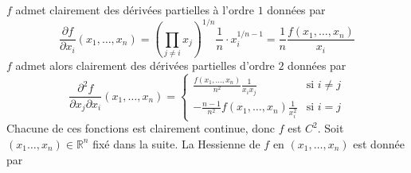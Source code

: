 \documentclass{report}
\begin{document}
\subsection{} \noindent{}\\ 
\\ 
\\
\noindent $f$ admet clairement des dérivées partielles à l'ordre $1$ données par $$\frac{\partial f}{\partial x_i}(x_1,\ldots,x_n)=\left( \prod_{j\neq i} x_j\right)^{1/n}\frac{1}{n}\cdot x_i^{ 1/n -1}=\frac{1}{n}\frac{f(x_1,\ldots,x_n)}{x_i}$$
$f$ admet alors clairement des dérivées partielles d'ordre $2$ données par 
$$\frac{\partial^2 f}{\partial x_j \partial x_i}(x_1,\ldots, x_n) = \begin{cases}
\frac{f(x_1,\ldots,x_n)}{n^2} \frac 1{x_i x_j} &\text {si }i\neq j \\
-\frac{n-1}{n^2}f(x_1,\ldots,x_n)\frac{1}{x_i^2} &\text {si } i=j
\end{cases}$$
Chacune de ces fonctions est clairement continue, donc $f$ est $C^2$.\newline
Soit $(x_1\ldots,x_n)\in \mathbb R^n$ fixé dans la suite. La Hessienne de $f$ en $(x_1,\ldots, x_n)$ est donnée par 
\end{document}
